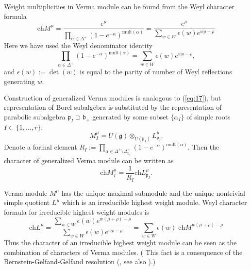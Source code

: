 \documentclass[preprint,12pt]{elsarticle}
\newcommand{\gf}{\mathfrak{g}}
\newcommand{\bff}{\mathfrak{b}}
\newcommand{\pf}{\mathfrak{p}}
\begin{document}
Weight multiplicities in Verma module can be found from the Weyl
character formula
\begin{equation}
  \label{eq:11}
  \mathrm{ch} M^{\mu}=\frac{e^{\mu}}{\prod_{\alpha\in \Delta^{+}} \left( 1-e^{-\alpha}\right)^{\mathrm{mult}(\alpha)}}=\frac{e^{\mu}}{\sum_{w\in W} \epsilon(w) e^{w\rho-\rho}}
\end{equation}
Here we have used the Weyl denominator identity
\begin{equation}
  \label{eq:12}
  \prod_{\alpha\in \Delta^{+}} \left( 1-e^{-\alpha}\right)^{\mathrm{mult}(\alpha)}=\sum_{w\in W} \epsilon(w) e^{w\rho-\rho},
\end{equation}
and $\epsilon \left( w\right) :=\det \left( w\right)$ is equal to
the parity of number of Weyl reflections generating $w$.

Construction of generalized Verma modules is analogous to (\ref{eq:17}), but representation of Borel subalgebra is substituted by the representation of parabolic subalgebra $\pf_{I}\supset \bff_{+}$ generated by some subset $\{\alpha_{I}\}$ of simple roots $I\subset \{1,\dots, r\}$:
\begin{equation*}
M_{I}^{\mu}=U\left( \gf\right)\otimes _{U\left( \pf_{I}\right) }L_{\pf_{I}}^{\mu}.
\end{equation*}
Denote a formal element $R_{I}:=\prod_{\alpha \in \Delta
^{+}\setminus \Delta _{\pf_{I}}^{+}}\left( 1-e^{-\alpha }\right)
^{\mathrm{mult}(\alpha )}$. Then the character of generalized
Verma module can be written as
\begin{equation}
  \label{eq:18}
  \mathrm{ch}M_{I}^{\mu}=\frac{1}{R_{I}}\mathrm{ch}L_{\pf_{I}}^{\mu }.
\end{equation}

Verma module $M^{\mu}$ has the unique maximal submodule and the
unique nontrivial simple quotient $L^{\mu}$ which is an
irreducible highest weight module. Weyl character formula for
irreducible highest weight modules is
\begin{equation}
  \label{eq:13}
  \mathrm{ch} L^{\mu}=\frac{\sum_{w\in W} \epsilon(w) e^{w(\mu+\rho)-\rho}}{\sum_{w\in W}\epsilon(w) e^{w\rho-\rho}}=\sum_{w\in W} \epsilon(w)\; \mathrm{ch} M^{w(\mu+\rho)-\rho}
\end{equation}
Thus the character of an irreducible highest weight module can be
seen as the combination of characters of Verma modules. ( This
fact is a consequence of the Bernstein-Gelfand-Gelfand resolution
(\cite{bernstein1976category,bernstein1971structure}, see also
\cite{humphreys2008representations}).)
\end{document}
